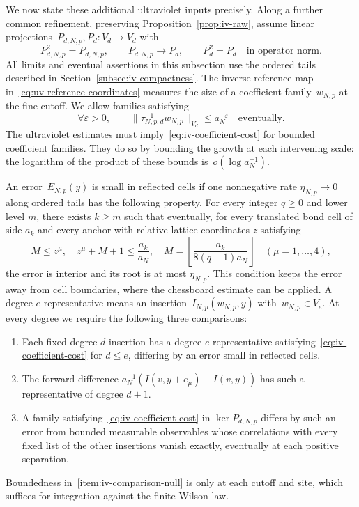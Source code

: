 We now state these additional ultraviolet inputs precisely.
Along a further common refinement, preserving Proposition~\ref{prop:iv-raw}, assume linear projections~$P_{d,N,p},P_d:V_d\to V_d$ with
\begin{equation}\label{eq:iv-projections}
 P_{d,N,p}^2=P_{d,N,p},\qquad
 P_{d,N,p}\longrightarrow P_d,\qquad P_d^2=P_d
 \quad\text{in operator norm}.
\end{equation}
All limits and eventual assertions in this subsection use the ordered tails described in Section~\ref{subsec:iv-compactness}.
The inverse reference map in~\eqref{eq:uv-reference-coordinates} measures the size of a coefficient family~$w_{N,p}$ at the fine cutoff.
We allow families satisfying
\begin{equation}\label{eq:iv-coefficient-cost}
 \forall\varepsilon>0,\qquad
 \|\tau_{N,p,d}^{-1}w_{N,p}\|_{V_d}\le a_N^{-\varepsilon}
 \quad\text{eventually}.
\end{equation}
The ultraviolet estimates must imply~\eqref{eq:iv-coefficient-cost} for bounded coefficient families.
They do so by bounding the growth at each intervening scale: the logarithm of the product of these bounds is~$o(\log a_N^{-1})$.

An error~$E_{N,p}(y)$ is small in reflected cells if one nonnegative rate $\eta_{N,p}\to0$ along ordered tails has the following property.
For every integer $q\ge0$ and lower level $m$, there exists $k\ge m$ such that eventually, for every translated bond cell of side $a_k$ and every anchor with relative lattice coordinates $z$ satisfying
\begin{equation}\label{eq:iv-error-cells}
M\le z^\mu,\quad z^\mu+M+1\le \frac{a_k}{a_N},\quad
M=\left\lfloor\frac{a_k}{8(q+1)a_N}\right\rfloor
\quad(\mu=1,\ldots,4),
\end{equation}
the error is interior and its root is at most $\eta_{N,p}$.
This condition keeps the error away from cell boundaries, where the chessboard estimate can be applied.
A degree-$e$ representative means an insertion~$I_{N,p}(w_{N,p},y)$ with~$w_{N,p}\in V_e$.
At every degree we require the following three comparisons:
\begin{enumerate}[label=\textup{(C\arabic*)},ref=C\arabic*]
\item\label{item:iv-comparison-inclusion} Each fixed degree-$d$ insertion has a degree-$e$ representative satisfying~\eqref{eq:iv-coefficient-cost} for $d\le e$, differing by an error small in reflected cells.
\item\label{item:iv-comparison-difference} The forward difference $a_N^{-1}(I(v,y+e_\mu)-I(v,y))$ has such a representative of degree $d+1$.
\item\label{item:iv-comparison-null} A family satisfying~\eqref{eq:iv-coefficient-cost} in $\ker P_{d,N,p}$ differs by such an error from bounded measurable observables whose correlations with every fixed list of the other insertions vanish exactly, eventually at each positive separation.
\end{enumerate}
Boundedness in~\ref{item:iv-comparison-null} is only at each cutoff and site, which suffices for integration against the finite Wilson law.


